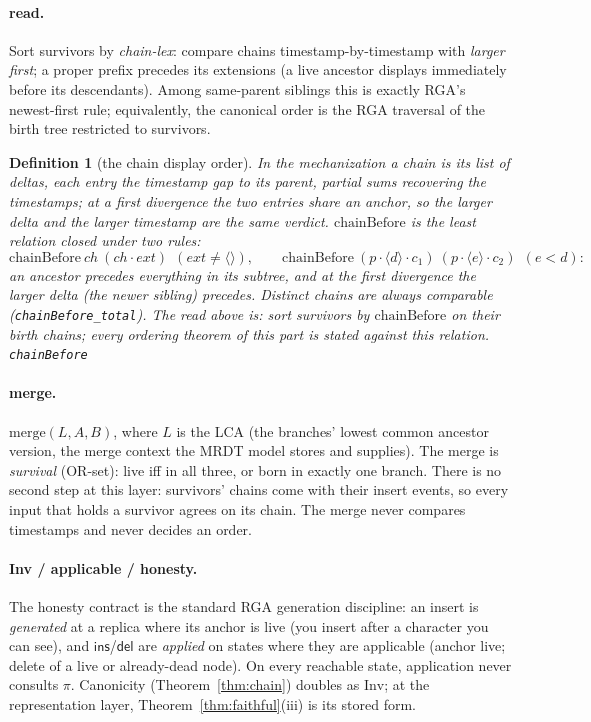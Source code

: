 \documentclass[11pt]{article}
\newtheorem{definition}[theorem]{Definition}
\newcommand{\lean}[1]{\texttt{#1}}
\newcommand{\del}{\mathsf{del}}
\newcommand{\ins}{\mathsf{ins}}
\begin{document}
\paragraph{read.} Sort survivors by \emph{chain-lex}: compare chains
timestamp-by-timestamp with \emph{larger first}; a proper prefix
precedes its extensions (a live ancestor displays immediately before
its descendants). Among same-parent siblings this is exactly RGA's
newest-first rule; equivalently, the canonical order is the RGA
traversal of the birth tree restricted to survivors.

\begin{definition}[the chain display order]
\label{def:chainbefore}
In the mechanization a chain is its list of \emph{deltas}, each
entry the timestamp gap to its parent, partial sums recovering the
timestamps; at a first divergence the two entries share an anchor, so
the larger delta and the larger timestamp are the same verdict.
$\mathrm{chainBefore}$ is the least relation closed under two rules:
\[
  \mathrm{chainBefore}\ ch\ (ch \cdot ext)
  \ \ (ext \ne \langle\rangle),
  \qquad
  \mathrm{chainBefore}\ (p \cdot \langle d \rangle \cdot c_1)\
  (p \cdot \langle e \rangle \cdot c_2)
  \ \ (e < d) :
\]
an ancestor precedes everything in its subtree, and at the first
divergence the larger delta (the newer sibling) precedes. Distinct
chains are always comparable (\lean{chainBefore\_total}). The read
above is: sort survivors by $\mathrm{chainBefore}$ on their birth
chains; every ordering theorem of this part is stated against this
relation.
\hfill\lean{chainBefore}
\end{definition}

\paragraph{merge.} $\mathrm{merge}(\mathit{L}, A, B)$, where
$\mathit{L}$ is the LCA (the branches' lowest common ancestor
version, the merge context the MRDT model stores and supplies). The
merge is \emph{survival} (OR-set): live iff in all three, or born
in exactly one branch. There is no second step at this layer:
survivors' chains come with their insert events, so every input that
holds a survivor agrees on its chain. The merge never compares
timestamps and never decides an order.

\paragraph{Inv / applicable / honesty.} The honesty contract is the
standard RGA generation discipline: an insert is \emph{generated} at a replica where its
anchor is live (you insert after a character you can see), and
$\ins$/$\del$ are \emph{applied} on states where they are applicable
(anchor live; delete of a live or already-dead node). On every
reachable state, application never consults $\pi$. Canonicity
(Theorem~\ref{thm:chain}) doubles as $\mathrm{Inv}$; at the
representation layer, Theorem~\ref{thm:faithful}(iii) is its stored
form.
\end{document}

